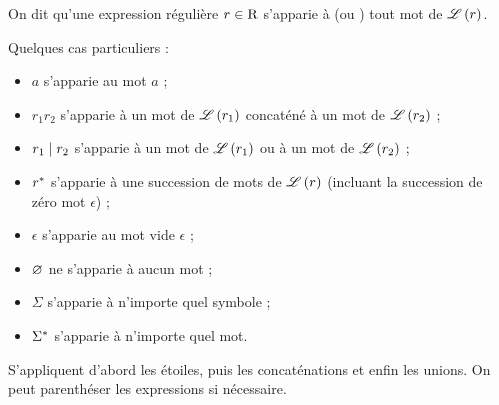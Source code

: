 \begin{defi}
On dit qu'une expression régulière \(r\in\operatorname{R}\) s'apparie à (ou ) tout mot de \(\mathscr{L}\left(r\right)\).

Quelques cas particuliers :

\begin{itemize}
    \item \(a\) s'apparie au mot \(a\) ; \\
    \item \(r_1r_2\) s'apparie à un mot de \(\mathscr{L}\left(r_1\right)\) concaténé à un mot de \(\mathscr{L}\left(r_2\right)\) ; \\
    \item \(r_1\mid r_2\) s'apparie à un mot de \(\mathscr{L}\left(r_1\right)\) ou à un mot de \(\mathscr{L}\left(r_2\right)\) ; \\
    \item \(r^{*}\) s'apparie à une succession de mots de \(\mathscr{L}\left(r\right)\) (incluant la succession de zéro mot \(\epsilon\)) ; \\
    \item \(\epsilon\) s'apparie au mot vide \(\epsilon\) ; \\
    \item \(\varnothing\) ne s'apparie à aucun mot ; \\
    \item \(\Sigma\) s'apparie à n'importe quel symbole ; \\
    \item \(\Sigma^{*}\) s'apparie à n'importe quel mot.
\end{itemize}
\end{defi}

\begin{rem}[Priorités]
S'appliquent d'abord les étoiles, puis les concaténations et enfin les unions. On peut parenthéser les expressions si nécessaire.
\end{rem}

